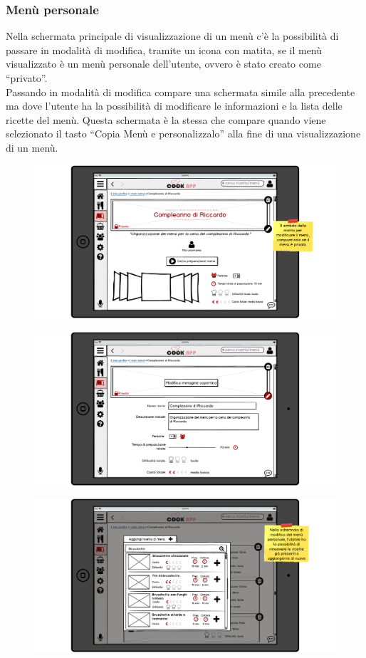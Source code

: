 \begin{itemize}
\subsubsection{Menù personale}
Nella schermata principale di visualizzazione di un menù c'è la
possibilità di passare in modalità di modifica, tramite un icona con
matita, se il menù visualizzato è un menù personale dell'utente, ovvero
è stato creato come ``privato''.\\
Passando in modalità di modifica compare una schermata simile alla
precedente ma dove l'utente ha la possibilità di modificare le
informazioni e la lista delle ricette del menù. Questa schermata è la
stessa che compare quando viene selezionato il tasto ``Copia Menù e
personalizzalo'' alla fine di una visualizzazione di un menù.
\begin{figure}[H]
	\centering
	\includegraphics[width=0.95\linewidth]{img/mockup/menu-personale-1.png}
\end{figure}
\begin{figure}[H]
	\centering
	\includegraphics[width=0.95\linewidth]{img/mockup/menu-personale-2.png}
\end{figure}
\begin{figure}[H]
	\centering
	\includegraphics[width=0.95\linewidth]{img/mockup/menu-personale-3.png}
\end{figure}



\end{itemize}
